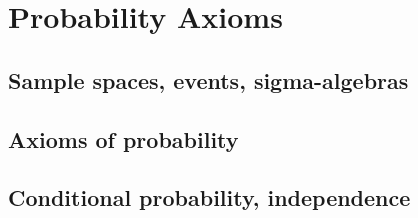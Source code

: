 
\section{Probability Axioms}

\subsection{Sample spaces, events, sigma-algebras}


\subsection{Axioms of probability}


\subsection{Conditional probability, independence}

